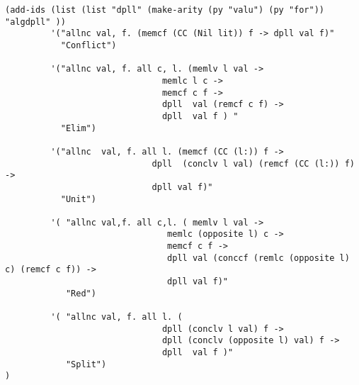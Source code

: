 \begin{lstlisting}[caption = "The DPLL Proof System as an Inductive Definition in Minlog"]
(add-ids (list (list "dpll" (make-arity (py "valu") (py "for")) "algdpll" ))
         '("allnc val, f. (memcf (CC (Nil lit)) f -> dpll val f)"
           "Conflict")

         '("allnc val, f. all c, l. (memlv l val ->                                                                                                             
                               memlc l c ->                                                                                                                     
                               memcf c f ->                                                                                                                     
                               dpll  val (remcf c f) ->                                                                                                         
                               dpll  val f ) "
           "Elim")

         '("allnc  val, f. all l. (memcf (CC (l:)) f ->                                                                                                         
                             dpll  (conclv l val) (remcf (CC (l:)) f) ->                                                                                        
                             dpll val f)"
           "Unit")

         '( "allnc val,f. all c,l. ( memlv l val ->                                                                                                             
                                memlc (opposite l) c ->                                                                                                         
                                memcf c f ->                                                                                                                    
                                dpll val (conccf (remlc (opposite l) c) (remcf c f)) ->                                                                         
                                dpll val f)"
            "Red")

         '( "allnc val, f. all l. (                                                                                                                             
                               dpll (conclv l val) f ->                                                                                                         
                               dpll (conclv (opposite l) val) f ->                                                                                              
                               dpll  val f )"
            "Split")
)
\end{lstlisting}



